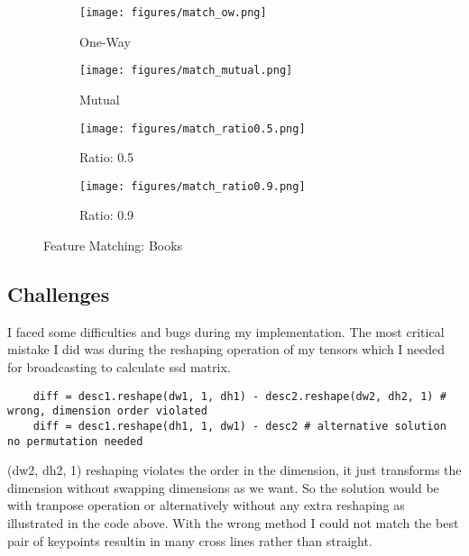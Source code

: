 \documentclass{article}
\begin{document}
\begin{figure}[H]
     \centering
     \begin{subfigure}[b]{0.4\textwidth}
         \centering
         \texttt{[image: figures/match\_ow.png]}
         \caption{One-Way}
         \label{fig:oneway}
     \end{subfigure}
     \begin{subfigure}[b]{0.4\textwidth}
         \centering
         \texttt{[image: figures/match\_mutual.png]}
         \caption{Mutual}
         \label{fig:mutual}
     \end{subfigure}
     \begin{subfigure}[b]{0.4\textwidth}
         \centering
         \texttt{[image: figures/match\_ratio0.5.png]}
         \caption{Ratio: 0.5}
         \label{fig:ratio0.5}
     \end{subfigure}
     \begin{subfigure}[b]{0.4\textwidth}
         \centering
         \texttt{[image: figures/match\_ratio0.9.png]}
         \caption{Ratio: 0.9}
         \label{fig:ratio0.9}
     \end{subfigure}     
        \caption{Feature Matching: Books}
        \label{fig:bookmatch}
\end{figure}



\subsection{Challenges}

\begin{center}
    \raggedright

    I faced some difficulties and bugs during my implementation. The most critical mistake I did was during the reshaping operation of my tensors which I needed for broadcasting to calculate ssd matrix.   
\end{center}


    \begin{verbatim}
    diff = desc1.reshape(dw1, 1, dh1) - desc2.reshape(dw2, dh2, 1) # wrong, dimension order violated
    diff = desc1.reshape(dh1, 1, dw1) - desc2 # alternative solution no permutation needed
    \end{verbatim}

\begin{center}
    \raggedright
    (dw2, dh2, 1) reshaping violates the order in the dimension, it just transforms the dimension without swapping dimensions as we want. So the solution would be with tranpose operation or alternatively without any extra reshaping as illustrated in the code above. With the wrong method I could not match the best pair of keypoints resultin in many cross lines rather than straight.
    
\end{center}
    
\end{document}
